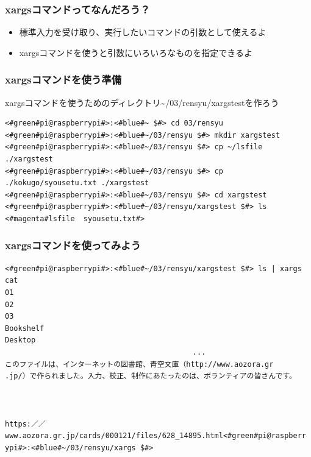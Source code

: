 \documentclass[slide03.tex]{subfiles}
\begin{document}
\begin{frame}
    \frametitle{xargsコマンドってなんだろう？}
    \vspace{2em}
    \begin{itemize}
        \item 標準入力を受け取り、実行したいコマンドの引数として使えるよ
        \item xargsコマンドを使うと引数にいろいろなものを指定できるよ
    \end{itemize}
    \begin{figure}
        \centering
        
    \end{figure}
\end{frame}

\begin{frame}[fragile]
    \frametitle{xargsコマンドを使う準備}
    xargsコマンドを使うためのディレクトリ\textasciitilde/03/rensyu/xargstestを作ろう
    \begin{lstlisting}
<#green#pi@raspberrypi#>:<#blue#~ $#> cd 03/rensyu
<#green#pi@raspberrypi#>:<#blue#~/03/rensyu $#> mkdir xargstest
<#green#pi@raspberrypi#>:<#blue#~/03/rensyu $#> cp ~/lsfile ./xargstest
<#green#pi@raspberrypi#>:<#blue#~/03/rensyu $#> cp ./kokugo/syousetu.txt ./xargstest
<#green#pi@raspberrypi#>:<#blue#~/03/rensyu $#> cd xargstest
<#green#pi@raspberrypi#>:<#blue#~/03/rensyu/xargstest $#> ls
<#magenta#lsfile  syousetu.txt#>
    \end{lstlisting}
\end{frame}

\begin{frame}[fragile]
    \frametitle{xargsコマンドを使ってみよう}
    \begin{lstlisting}[title=xargsコマンドを使ってcatコマンドを使う]
<#green#pi@raspberrypi#>:<#blue#~/03/rensyu/xargstest $#> ls | xargs cat
01
02
03
Bookshelf
Desktop
                                           ...
このファイルは、インターネットの図書館、青空文庫（http://www.aozora.gr
.jp/）で作られました。入力、校正、制作にあたったのは、ボランティアの皆さんです。



https:／／www.aozora.gr.jp/cards/000121/files/628_14895.html<#green#pi@raspberr
ypi#>:<#blue#~/03/rensyu/xargs $#>
    \end{lstlisting}
\end{frame}
\end{document}
